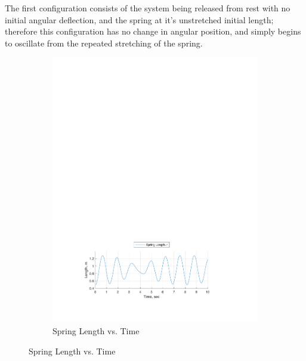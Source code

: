 \documentclass[12pt]{report}
\begin{document}
\begin{flushleft}
The first configuration consists of the system being released from rest with no initial
angular deflection, and the spring at it's unstretched initial length; therefore this configuration has no change in angular position, and simply begins to oscillate from the repeated
stretching of the spring.

\begin{figure}[!ht]
\caption{Numerical Solution Motion Behavior Plot, ($\theta_o:~\sfrac{\pi}{18},~\phi_o:~\sfrac{\pi}{9}$)}
\begin{subfigure}[t]{\textwidth}
  \includegraphics[center]{spring_18-9}
  \caption{Spring Length vs. Time}
  \label{fig:spring:18-9}
\end{subfigure}
\end{figure}
\begin{figure}[!ht] \ContinuedFloat
\begin{subfigure}[t]{\textwidth}

\end{subfigure}
\end{figure}
\end{flushleft}
\end{document}
